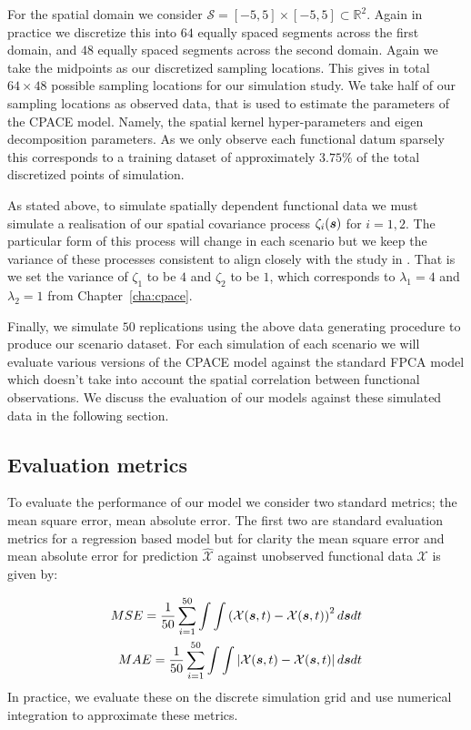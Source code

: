 For the spatial domain we consider $\mathcal{S} = \left[-5, 5\right] \times \left[-5, 5\right] \subset \mathbb{R}^2$.
Again in practice we discretize this into $64$ equally spaced segments across the first domain, and $48$ equally spaced segments across the second domain.
Again we take the midpoints as our discretized sampling locations.
This gives in total $64 \times 48$ possible sampling locations for our simulation study.
We take half of our sampling locations as observed data, that is used to estimate the parameters of the CPACE model.
Namely, the spatial kernel hyper-parameters and eigen decomposition parameters.
As we only observe each functional datum sparsely this corresponds to a training dataset of approximately $3.75\%$ of the total discretized points of simulation.

As stated above, to simulate spatially dependent functional data we must simulate a realisation of our spatial covariance process $\zeta_i(\bm{{s}})$ for $i=1,2$. 
The particular form of this process will change in each scenario but we keep the variance of these processes consistent to align closely with the study in \citep{yao_functional_2005}.
That is we set the variance of $\zeta_1$ to be $4$ and $\zeta_2$ to be $1$, which corresponds to $\lambda_1 = 4$ and $\lambda_2=1$ from Chapter~\ref{cha:cpace}.

Finally, we simulate $50$ replications using the above data generating procedure to produce our scenario dataset.
For each simulation of each scenario we will evaluate various versions of the CPACE model against the standard FPCA model which doesn't take into account the spatial correlation between functional observations.
We discuss the evaluation of our models against these simulated data in the following section. 

\subsection{Evaluation metrics \label{ssec:eval_metrics}}
To evaluate the performance of our model we consider two standard metrics; the mean square error, mean absolute error.
The first two are standard evaluation metrics for a regression based model but for clarity the mean square error and mean absolute error for prediction $\hat{\mathcal{X}}$ against unobserved functional data $\mathcal{X}$ is given by:

\begin{eqnarray}
	MSE = \frac{1}{50} \sum_{i=1}^{50} \int \int \left( \mathcal{X}(\bm{{s}}, t) - \mathcal{X}(\bm{{s}}, t) \right)^2 d\bm{{s}} dt \nonumber \\
	MAE = \frac{1}{50} \sum_{i=1}^{50} \int \int \left| \mathcal{X}(\bm{{s}}, t) - \mathcal{X}(\bm{{s}}, t) \right| d\bm{{s}} dt \nonumber
\end{eqnarray}
In practice, we evaluate these on the discrete simulation grid and use numerical integration to approximate these metrics.

